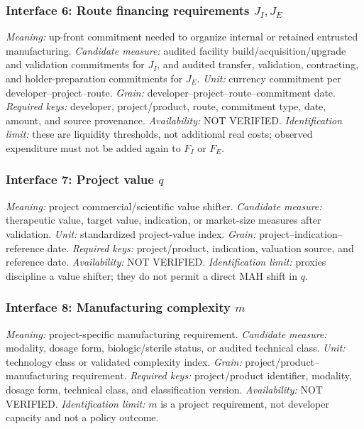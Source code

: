 \subsubsection{Interface 6: Route financing requirements \texorpdfstring{\(J_I,J_E\)}{J(I), J(E)}}
\textit{Meaning:} up-front commitment needed to organize internal or retained
entrusted manufacturing.
\textit{Candidate measure:} audited facility build/acquisition/upgrade and
validation commitments for \(J_I\), and audited transfer, validation,
contracting, and holder-preparation commitments for \(J_E\).
\textit{Unit:} currency commitment per developer--project--route.
\textit{Grain:} developer--project--route--commitment date.
\textit{Required keys:} developer, project/product, route, commitment type,
date, amount, and source provenance.
\textit{Availability:} NOT VERIFIED.
\textit{Identification limit:} these are liquidity thresholds, not additional
real costs; observed expenditure must not be added again to \(F_I\) or \(F_E\).

\subsubsection{Interface 7: Project value \texorpdfstring{\(q\)}{project-value index}}
\textit{Meaning:} project commercial/scientific value shifter.
\textit{Candidate measure:} therapeutic value, target value, indication, or
market-size measures after validation.
\textit{Unit:} standardized project-value index.
\textit{Grain:} project--indication--reference date.
\textit{Required keys:} project/product, indication, valuation source, and
reference date.
\textit{Availability:} NOT VERIFIED.
\textit{Identification limit:} proxies discipline a value shifter; they do
not permit a direct MAH shift in \(q\).

\subsubsection{Interface 8: Manufacturing complexity \texorpdfstring{\(m\)}{complexity index}}
\textit{Meaning:} project-specific manufacturing requirement.
\textit{Candidate measure:} modality, dosage form, biologic/sterile status, or
audited technical class.
\textit{Unit:} technology class or validated complexity index.
\textit{Grain:} project/product--manufacturing requirement.
\textit{Required keys:} project/product identifier, modality, dosage form,
technical class, and classification version.
\textit{Availability:} NOT VERIFIED.
\textit{Identification limit:} \(m\) is a project requirement, not developer
capacity and not a policy outcome.

